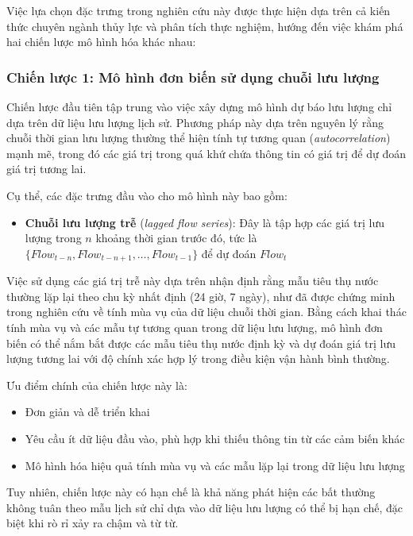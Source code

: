 Việc lựa chọn đặc trưng trong nghiên cứu này được thực hiện dựa trên cả kiến thức chuyên ngành thủy lực và phân tích thực nghiệm, hướng đến việc khám phá hai chiến lược mô hình hóa khác nhau:

\subsubsection{Chiến lược 1: Mô hình đơn biến sử dụng chuỗi lưu lượng}

Chiến lược đầu tiên tập trung vào việc xây dựng mô hình dự báo lưu lượng chỉ dựa trên dữ liệu lưu lượng lịch sử. Phương pháp này dựa trên nguyên lý rằng chuỗi thời gian lưu lượng thường thể hiện tính tự tương quan (\textit{autocorrelation}) mạnh mẽ, trong đó các giá trị trong quá khứ chứa thông tin có giá trị để dự đoán giá trị tương lai.

Cụ thể, các đặc trưng đầu vào cho mô hình này bao gồm:
\begin{itemize}
    \item \textbf{Chuỗi lưu lượng trễ} (\textit{lagged flow series}): Đây là tập hợp các giá trị lưu lượng trong $n$ khoảng thời gian trước đó, tức là $\{Flow_{t-n}, Flow_{t-n+1}, \ldots, Flow_{t-1}\}$ để dự đoán $Flow_t$
\end{itemize}

Việc sử dụng các giá trị trễ này dựa trên nhận định rằng mẫu tiêu thụ nước thường lặp lại theo chu kỳ nhất định (24 giờ, 7 ngày), như đã được chứng minh trong nghiên cứu về tính mùa vụ của dữ liệu chuỗi thời gian. Bằng cách khai thác tính mùa vụ và các mẫu tự tương quan trong dữ liệu lưu lượng, mô hình đơn biến có thể nắm bắt được các mẫu tiêu thụ nước định kỳ và dự đoán giá trị lưu lượng tương lai với độ chính xác hợp lý trong điều kiện vận hành bình thường.

Ưu điểm chính của chiến lược này là:
\begin{itemize}
    \item Đơn giản và dễ triển khai
    \item Yêu cầu ít dữ liệu đầu vào, phù hợp khi thiếu thông tin từ các cảm biến khác
    \item Mô hình hóa hiệu quả tính mùa vụ và các mẫu lặp lại trong dữ liệu lưu lượng
\end{itemize}

Tuy nhiên, chiến lược này có hạn chế là khả năng phát hiện các bất thường không tuân theo mẫu lịch sử chỉ dựa vào dữ liệu lưu lượng có thể bị hạn chế, đặc biệt khi rò rỉ xảy ra chậm và từ từ.

